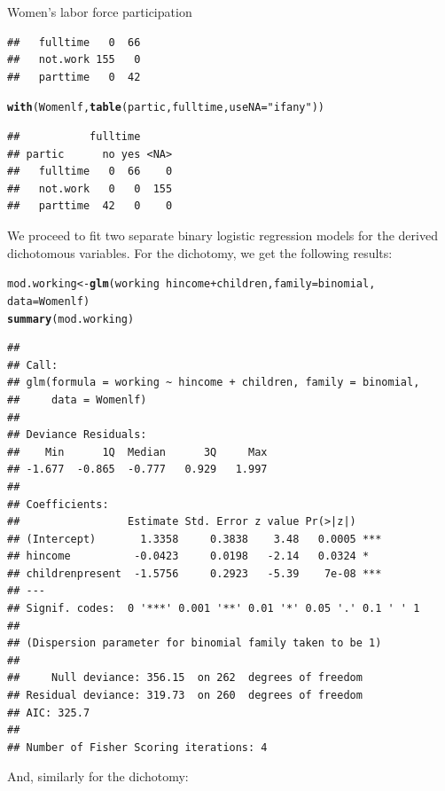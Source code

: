 \documentclass[11pt]{book}\usepackage[]{graphicx}\usepackage[]{color}
\makeatletter
\newcommand{\hlstr}[1]{\textcolor[rgb]{0.192,0.494,0.8}{#1}}%
\newcommand{\hlopt}[1]{\textcolor[rgb]{0,0,0}{#1}}%
\newcommand{\hlstd}[1]{\textcolor[rgb]{0.345,0.345,0.345}{#1}}%
\newcommand{\hlkwb}[1]{\textcolor[rgb]{0.69,0.353,0.396}{#1}}%
\newcommand{\hlkwc}[1]{\textcolor[rgb]{0.333,0.667,0.333}{#1}}%
\newcommand{\hlkwd}[1]{\textcolor[rgb]{0.737,0.353,0.396}{\textbf{#1}}}%
\newenvironment{kframe}{%
 \def\at@end@of@kframe{}%
 \ifinner\ifhmode%
  \def\at@end@of@kframe{\end{minipage}}%
  \begin{minipage}{\columnwidth}%
 \fi\fi%
 \def\FrameCommand##1{\hskip\@totalleftmargin \hskip-\fboxsep
 \colorbox{shadecolor}{##1}\hskip-\fboxsep
     \hskip-\linewidth \hskip-\@totalleftmargin \hskip\columnwidth}%
 \MakeFramed {\advance\hsize-\width
   \@totalleftmargin\z@ \linewidth\hsize
   \@setminipage}}%
 {\par\unskip\endMakeFramed%
 \at@end@of@kframe}
\newenvironment{knitrout}{}{} %
\renewenvironment{knitrout}{\small\renewcommand{\baselinestretch}{.85}}{} %
\makeatother
\begin{document}
\begin{Example}[wlfpart1]{Women's labor force participation}
\begin{knitrout}
\begin{kframe}
\begin{verbatim}
##   fulltime   0  66
##   not.work 155   0
##   parttime   0  42
\end{verbatim}
\begin{alltt}
\hlkwd{with}\hlstd{(Womenlf,} \hlkwd{table}\hlstd{(partic, fulltime,} \hlkwc{useNA}\hlstd{=}\hlstr{"ifany"}\hlstd{))}
\end{alltt}
\begin{verbatim}
##           fulltime
## partic      no yes <NA>
##   fulltime   0  66    0
##   not.work   0   0  155
##   parttime  42   0    0
\end{verbatim}
\end{kframe}
\end{knitrout}

We proceed to fit two separate binary logistic regression models
for the derived dichotomous variables.
For the  dichotomy, we get the following results:
\begin{knitrout}
\color{fgcolor}\begin{kframe}
\begin{alltt}
\hlstd{mod.working} \hlkwb{<-} \hlkwd{glm}\hlstd{(working} \hlopt{~} \hlstd{hincome} \hlopt{+} \hlstd{children,} \hlkwc{family}\hlstd{=binomial,}
                   \hlkwc{data}\hlstd{=Womenlf)}
\hlkwd{summary}\hlstd{(mod.working)}
\end{alltt}
\begin{verbatim}
## 
## Call:
## glm(formula = working ~ hincome + children, family = binomial, 
##     data = Womenlf)
## 
## Deviance Residuals: 
##    Min      1Q  Median      3Q     Max  
## -1.677  -0.865  -0.777   0.929   1.997  
## 
## Coefficients:
##                 Estimate Std. Error z value Pr(>|z|)    
## (Intercept)       1.3358     0.3838    3.48   0.0005 ***
## hincome          -0.0423     0.0198   -2.14   0.0324 *  
## childrenpresent  -1.5756     0.2923   -5.39    7e-08 ***
## ---
## Signif. codes:  0 '***' 0.001 '**' 0.01 '*' 0.05 '.' 0.1 ' ' 1
## 
## (Dispersion parameter for binomial family taken to be 1)
## 
##     Null deviance: 356.15  on 262  degrees of freedom
## Residual deviance: 319.73  on 260  degrees of freedom
## AIC: 325.7
## 
## Number of Fisher Scoring iterations: 4
\end{verbatim}
\end{kframe}
\end{knitrout}
And, similarly for the  dichotomy:
\begin{knitrout}
\color{fgcolor}\begin{kframe}

\end{kframe}
\end{knitrout}
\end{Example}
\end{document}
